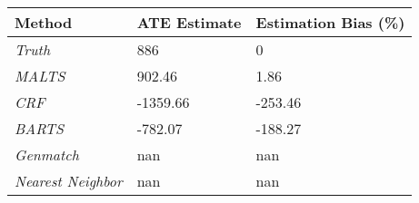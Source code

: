  \begin{table}[h]
\centering
\begin{tabular}{|l|l|l|}
\hline
\textbf{Method}           & \textbf{ATE Estimate} & \textbf{Estimation Bias (\%)} \\ \hline
\textit{Truth}            & 886                   & 0                             \\ \hline
\textit{MALTS}            & 902.46                & 1.86                          \\ \hline
\textit{CRF}              & -1359.66              & -253.46                       \\ \hline
\textit{BARTS}            & -782.07               & -188.27                       \\ \hline
\textit{Genmatch}         & nan                   & nan                           \\ \hline
\textit{Nearest Neighbor} & nan                   & nan                           \\ \hline
\end{tabular}
\end{table}